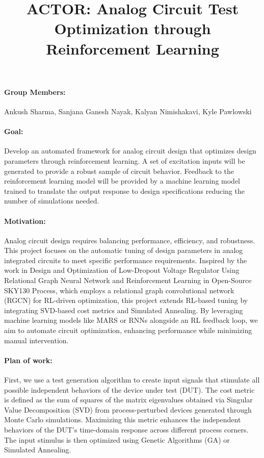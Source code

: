 \documentclass[a4paper, 12pt]{article}
\begin{document}
\title{ACTOR: Analog Circuit Test Optimization through Reinforcement Learning}

\maketitle

\paragraph
{\bf Group Members:} Ankush Sharma, Sanjana Ganesh Nayak, Kalyan Nimishakavi, Kyle Pawlowski
 

\paragraph
{\bf Goal:}
Develop an automated framework for analog circuit design that optimizes design parameters through reinforcement learning. A set of excitation inputs will be generated to provide a robust sample of circuit behavior. Feedback to the reinforcement learning model will be provided by a machine learning model trained to translate the output response to design specifications reducing the number of simulations needed. 

\paragraph
{\bf Motivation:}
Analog circuit design requires balancing performance, efficiency, and robustness. This project focuses on the automatic tuning of design parameters in analog integrated circuits to meet specific performance requirements. Inspired by the work in Design and Optimization of Low-Dropout Voltage Regulator Using Relational Graph Neural Network and Reinforcement Learning in Open-Source SKY130 Process, which employs a relational graph convolutional network (RGCN) for RL-driven optimization, this project extends RL-based tuning by integrating SVD-based cost metrics and Simulated Annealing. By leveraging machine learning models like MARS or RNNs alongside an RL feedback loop, we aim to automate circuit optimization, enhancing performance while minimizing manual intervention.

\paragraph
{\bf Plan of work:}
First, we use a test generation algorithm to create input signals that stimulate all possible independent behaviors of the device under test (DUT). The cost metric is defined as the sum of squares of the matrix eigenvalues obtained via Singular Value Decomposition (SVD) from process-perturbed devices generated through Monte Carlo simulations. Maximizing this metric enhances the independent behaviors of the DUT’s time-domain response across different process corners. The input stimulus is then optimized using Genetic Algorithms (GA) or Simulated Annealing.
\end{document}
